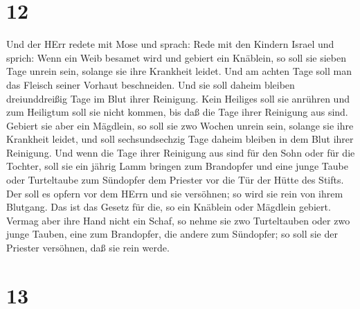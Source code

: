 \hypertarget{section-11}{%
\section{12}\label{section-11}}

 Und der HErr redete mit Mose und sprach:  Rede
mit den Kindern Israel und sprich: Wenn ein Weib besamet wird und
gebiert ein Knäblein, so soll sie sieben Tage unrein sein, solange sie
ihre Krankheit leidet.  Und am achten Tage soll man das
Fleisch seiner Vorhaut beschneiden.  Und sie soll daheim
bleiben dreiunddreißig Tage im Blut ihrer Reinigung. Kein Heiliges soll
sie anrühren und zum Heiligtum soll sie nicht kommen, bis daß die Tage
ihrer Reinigung aus sind.  Gebiert sie aber ein Mägdlein, so
soll sie zwo Wochen unrein sein, solange sie ihre Krankheit leidet, und
soll sechsundsechzig Tage daheim bleiben in dem Blut ihrer Reinigung.
 Und wenn die Tage ihrer Reinigung aus sind für den Sohn
oder für die Tochter, soll sie ein jährig Lamm bringen zum Brandopfer
und eine junge Taube oder Turteltaube zum Sündopfer dem Priester vor die
Tür der Hütte des Stifts.  Der soll es opfern vor dem HErrn
und sie versöhnen; so wird sie rein von ihrem Blutgang. Das ist das
Gesetz für die, so ein Knäblein oder Mägdlein gebiert. 
Vermag aber ihre Hand nicht ein Schaf, so nehme sie zwo Turteltauben
oder zwo junge Tauben, eine zum Brandopfer, die andere zum Sündopfer; so
soll sie der Priester versöhnen, daß sie rein werde.

\hypertarget{section-12}{%
\section{13}\label{section-12}}

